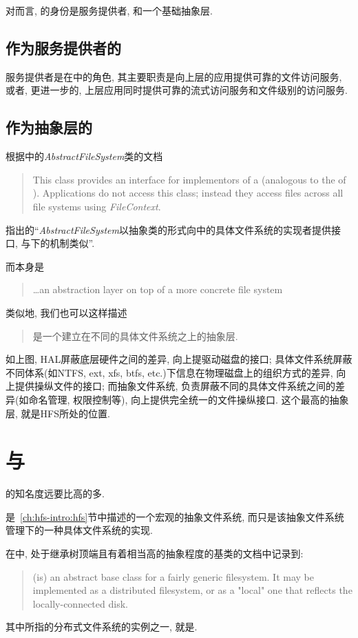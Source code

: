对\Hadoop 而言, \HFS 的身份是服务提供者, 和一个基础抽象层.

\subsection{作为服务提供者的\HFS}

服务提供者是\HFS 在\Hadoop 中的角色,
其主要职责是向上层的\Hadoop 应用提供可靠的文件访问服务, 或者, 更进一步的,
上层应用同时提供可靠的流式访问服务和文件级别的访问服务.

\subsection{作为抽象层的\HFS}

根据\HadoopFS 中的\emph{AbstractFileSystem}类的文档
\begin{quote}
This class provides an interface for implementors of a \HadoopFS
(analogous to the \VFS\space of \Unix). Applications do not access this class;
instead they access files across all file systems using \emph{FileContext}.
\end{quote}
指出的``\emph{AbstractFileSystem}以抽象类的形式向\HFS 中的具体文件系统的实现者提供接口,
与\Unix 下\VFS 的机制类似''.

而\VFS 本身是
\begin{quote}
    \ldots an abstraction layer on top of a more concrete file system
\end{quote}

类似地, 我们也可以这样描述\HFS
\begin{quote}
    \HFS 是一个建立在不同的具体文件系统之上的抽象层.
\end{quote}

\blankfigure{}

如上图, HAL屏蔽底层硬件之间的差异, 向上提驱动磁盘的接口;
具体文件系统屏蔽不同体系(如NTFS, ext, xfs, btfs, etc.)下信息在物理磁盘上的组织方式的差异,
向上提供操纵文件的接口;
而抽象文件系统, 负责屏蔽不同的具体文件系统之间的差异(如命名管理, 权限控制等),
向上提供完全统一的文件操纵接口. 这个最高的抽象层, 就是HFS所处的位置.

\section{\HFS 与\HDFS}

\HDFS 的知名度远要比\HFS 高的多.

\HadoopFS 是~\ref{ch:hfs-intro:hfs}节中描述的一个宏观的抽象文件系统,
而\HadoopDFS 只是该抽象文件系统管理下的一种具体文件系统的实现.

在\HFS 中, 处于继承树顶端且有着相当高的抽象程度的基类\FS 的文档中记录到:

\begin{quote}
(\FS\space is) an abstract base class for a fairly generic filesystem. It
may be implemented as a distributed filesystem, or as a "local"
one that reflects the locally-connected disk.
\end{quote}

其中所指的分布式文件系统的实例之一, 就是\HDFS.
